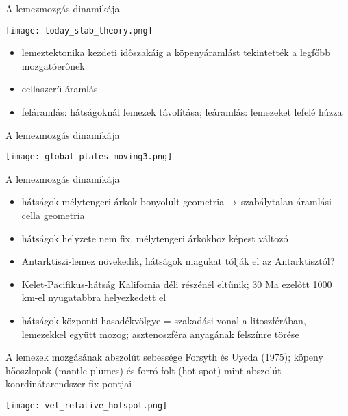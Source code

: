 \documentclass{beamer}
\begin{document}
\begin{frame}{A lemezmozgás dinamikája}
    \begin{center}
        \texttt{[image: today\_slab\_theory.png]}
    \end{center}
    \begin{itemize}
        \item lemeztektonika kezdeti időszakáig a köpenyáramlást tekintették a legfőbb mozgatóerőnek
        \item cellaszerű áramlás
        \item feláramlás: hátságoknál lemezek távolítása; leáramlás: lemezeket lefelé húzza
    \end{itemize}
\end{frame}


\begin{frame}{A lemezmozgás dinamikája}
    \begin{center}
        \texttt{[image: global\_plates\_moving3.png]}
    \end{center}
\end{frame}


\begin{frame}{A lemezmozgás dinamikája}
    \begin{itemize}
        \item hátságok mélytengeri árkok bonyolult geometria $\rightarrow$ szabálytalan áramlási cella geometria
        \item hátságok helyzete nem fix, mélytengeri árkokhoz képest változó
        \item Antarktiszi-lemez növekedik, hátságok magukat tólják el az Antarktisztól?
        \item Kelet-Pacifikus-hátság Kalifornia déli részénél eltűnik; 30 Ma ezelőtt 1000 km-el nyugatabbra helyezkedett el
        \item hátságok központi hasadékvölgye = szakadási vonal a litoszférában, lemezekkel együtt mozog; asztenoszféra anyagának felszínre törése
    \end{itemize}
\end{frame}


\begin{frame}{A lemezek mozgásának abszolút sebessége}
    Forsyth és Uyeda (1975); köpeny hőoszlopok (mantle plumes) és forró folt (hot spot) mint abszolút koordinátarendszer fix pontjai
    
    \begin{center}
        \texttt{[image: vel\_relative\_hotspot.png]}
    \end{center}
\end{frame}
\end{document}
